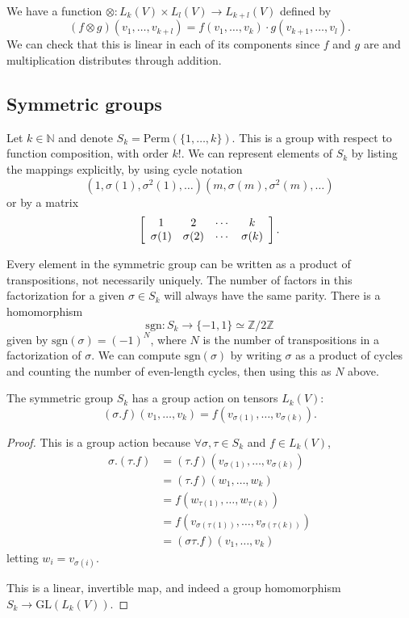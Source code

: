 \begin{defn}
We have a function
$\otimes : L_k (V) \times L_l(V) \to L_{k + l}(V)$ defined by
$$
  (f \otimes g)
    (v_1, \dots, v_{k+l})
= f(v_1, \dots, v_k) \cdot g(v_{k+1}, \dots, v_l).
$$
We can check that this is linear in each of its components since $f$
and $g$ are and multiplication distributes through addition.
\end{defn}

\subsection{Symmetric groups}
Let $k \in \mathbb{N}$ and denote
$S_k = \mathrm{Perm}(\{1, \dots, k\})$. This is a group with respect
to function composition, with order $k!$. We can represent elements of
$S_k$ by listing the mappings explicitly, by using cycle notation
$$
(1, \sigma(1), \sigma^2(1), \dots)(m, \sigma(m), \sigma^2(m), \dots)
$$
or by a matrix
$$
\left[
  \begin{array}{c c c c}
    1         & 2         & \cdots & k \\
    \sigma(1) & \sigma(2) & \cdots & \sigma(k)
  \end{array}
\right].
$$

Every element in the symmetric group can be written as a product of
transpositions, not necessarily uniquely. The number of factors in this
factorization for a given $\sigma \in S_k$ will always have the same
parity. There is a homomorphism
$$
       \mathrm{sgn} : S_k
\to    \{-1, 1\}
\simeq \mathbb{Z} / 2\mathbb{Z}
$$
given by $\mathrm{sgn}(\sigma) = (-1)^{N}$, where $N$ is the number of
transpositions in a factorization of $\sigma$. We can compute
$\mathrm{sgn}(\sigma)$ by writing $\sigma$ as a product of cycles and
counting the number of even-length cycles, then using this as $N$
above.

\begin{lemma}
The symmetric group $S_k$ has a group action on tensors $L_k(V)$:
$$
  (\sigma . f)(v_1, \dots, v_k)
= f(v_{\sigma(1)}, \dots, v_{\sigma(k)}).
$$
\end{lemma}
\begin{proof}
This is a group action because $\forall \sigma, \tau \in S_k$ and
$f \in L_k(V)$,
\begin{align*}
   \sigma . (\tau . f)
&= (\tau . f)(v_{\sigma(1)}, \dots, v_{\sigma(k)}) \\
&= (\tau . f)(w_1, \dots, w_k) \\
&= f(w_{\tau(1)}, \dots, w_{\tau(k)}) \\
&= f(v_{\sigma(\tau(1))}, \dots, v_{\sigma(\tau(k))}) \\
&= (\sigma \tau . f)(v_1, \dots, v_k)
\end{align*}
letting $w_i = v_{\sigma(i)}$.

This is a linear, invertible map, and indeed a group homomorphism
$S_k \to \mathrm{GL}(L_k(V))$.
\end{proof}

